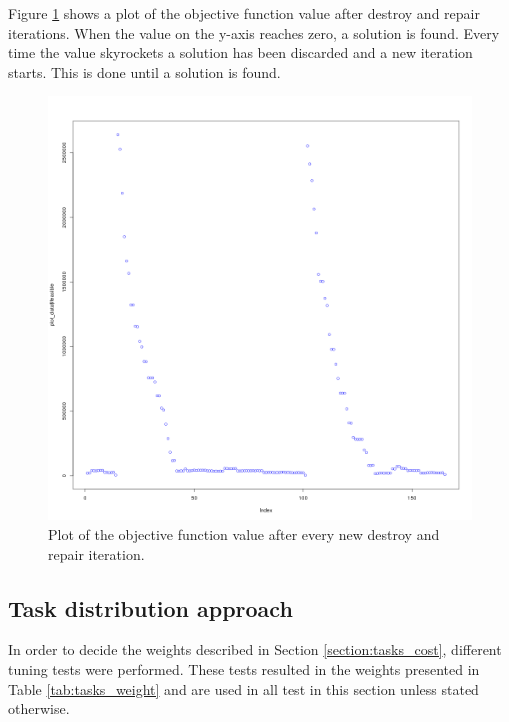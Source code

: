 Figure \ref{fig:feasibleRerun} shows a plot of the objective function value after destroy and repair iterations. When the value on the y-axis reaches zero, a solution is found. Every time the value skyrockets a solution has been discarded and a new iteration starts. This is done until a solution is found. 

\begin{figure}[!h]
\centering
\includegraphics[scale = 0.3]{Chapters/ImagesClaes/Rfeasible.png}
\caption{Plot of the objective function value after every new destroy and repair iteration.}
\label{fig:feasibleRerun}
\end{figure}

\subsection{Task distribution approach}\label{sec:task_dist_res}

In order to decide the weights described in Section \ref{section:tasks_cost}, different tuning tests were performed. These tests resulted in the weights presented in Table \ref{tab:tasks_weight} and are used in all test in this section unless stated otherwise. 

